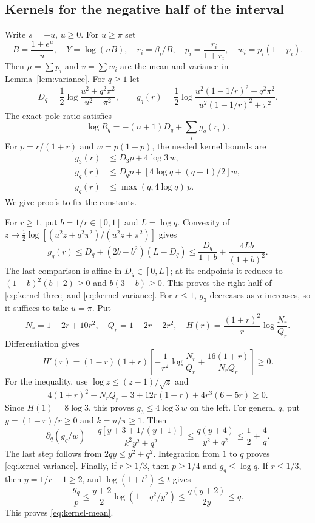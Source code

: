 \subsection{Kernels for the negative half of the interval}

Write $s=-u$, $u\ge0$. For $u\ge\pi$ set
\[
 B=\frac{1+e^u}{u},\quad Y=\log(nB),\quad
 r_i=\beta_i/B,\quad p_i=\frac{r_i}{1+r_i},\quad
 w_i=p_i(1-p_i).
\]
Then $\mu=\sum p_i$ and $v=\sum w_i$ are the mean and variance in
Lemma~\ref{lem:variance}. For $q\ge1$ let
\[
 D_q=\frac12\log\frac{u^2+q^2\pi^2}{u^2+\pi^2},\qquad
 g_q(r)=\frac12\log
 \frac{u^2(1-1/r)^2+q^2\pi^2}{u^2(1-1/r)^2+\pi^2}.
\]
The exact pole ratio satisfies
\begin{equation}\label{eq:negative-exact-ratio}
 \log R_q=-(n+1)D_q+\sum_i g_q(r_i).
\end{equation}
For $p=r/(1+r)$ and $w=p(1-p)$, the needed kernel bounds are
\begin{align}
 g_3(r)&\le D_3p+4\log3\,w,\label{eq:kernel-three}\\
 g_q(r)&\le D_qp+[4\log q+(q-1)/2]w,\label{eq:kernel-variance}\\
 g_q(r)&\le\max(q,4\log q)\,p.\label{eq:kernel-mean}
\end{align}
We give proofs to fix the constants.

For $r\ge1$, put $b=1/r\in[0,1]$ and $L=\log q$. Convexity of
$z\mapsto\tfrac12\log[(u^2z+q^2\pi^2)/(u^2z+\pi^2)]$ gives
\[
 g_q(r)\le D_q+(2b-b^2)(L-D_q)
 \le\frac{D_q}{1+b}+\frac{4Lb}{(1+b)^2}.
\]
The last comparison is affine in $D_q\in[0,L]$; at its endpoints it
reduces to $(1-b)^2(b+2)\ge0$ and $b(3-b)\ge0$.
This proves the right half of \eqref{eq:kernel-three} and
\eqref{eq:kernel-variance}.
For $r\le1$, $g_3$ decreases as $u$ increases, so it suffices to take
$u=\pi$. Put
\[
 N_r=1-2r+10r^2,\quad Q_r=1-2r+2r^2,\quad
 H(r)=\frac{(1+r)^2}{r}\log\frac{N_r}{Q_r}.
\]
Differentiation gives
\[
 H'(r)=(1-r)(1+r)
 \left[-\frac1{r^2}\log\frac{N_r}{Q_r}
       +\frac{16(1+r)}{N_rQ_r}\right]\ge0.
\]
For the inequality, use $\log z\le(z-1)/\sqrt z$ and
\[
 4(1+r)^2-N_rQ_r
 =3+12r(1-r)+4r^3(6-5r)\ge0.
\]
Since $H(1)=8\log3$, this proves $g_3\le4\log3\,w$ on the left.
For general $q$, put $y=(1-r)/r\ge0$ and $k=u/\pi\ge1$. Then
\[
 \partial_q(g_q/w)
 =\frac{q[y+3+1/(y+1)]}{k^2y^2+q^2}
 \le\frac{q(y+4)}{y^2+q^2}\le\frac12+\frac4q.
\]
The last step follows from $2qy\le y^2+q^2$. Integration from $1$
to $q$ proves \eqref{eq:kernel-variance}. Finally, if $r\ge1/3$,
then $p\ge1/4$ and $g_q\le\log q$. If $r\le1/3$, then
$y=1/r-1\ge2$, and $\log(1+t^2)\le t$ gives
\[
 \frac{g_q}{p}\le\frac{y+2}{2}\log(1+q^2/y^2)
 \le\frac{q(y+2)}{2y}\le q.
\]
This proves \eqref{eq:kernel-mean}.

